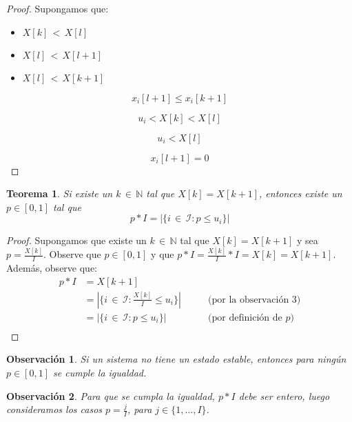\documentclass{article}
\newtheorem{teor}{Teorema}
\newtheorem{obs}{Observación}
\begin{document}
\begin{proof}
Supongamos que:
\begin{itemize}
\item $X[k]\,{<}\,X[l]$
\item $X[l]\,{<}\,X[l{+}1]$
\item $X[l]\,{<}\,X[k{+}1]$
\end{itemize}

\[
x_i[l{+}1]\leq x_i[k{+}1]
\]

\[
u_i<X[k]<X[l]
\]

\[
u_i<X[l]
\]

\[
x_i[l+1]=0
\]


\end{proof}

\begin{teor}
Si existe un $k\,{\in}\,\mathbb{N}$ tal que $X[k]=X[k{+}1]$, entonces existe un $p\in[0,1]$ tal que
\[p*I=|\{i\,{\in}\,\mathcal{I}:p\leq u_i\}|\] 
\end{teor}
\begin{proof}

Supongamos que existe un $k\,{\in}\,\mathbb{N}$ tal que $X[k]=X[k{+}1]$ y sea $p=\frac{X[k]}{I}$. Observe que $p\in[0,1]$ y que $p*I=\frac{X[k]}{I}*I=X[k]=X[k{+}1]$. Además, observe que:
\begin{align*}
p*I&=X[k{+}1]\\
&=|\{i\,{\in}\,\mathcal{I}:\frac{X[k]}{I}\leq u_i\}| &\qquad\mbox{(por la observación 3)}\\
&=|\{i\,{\in}\,\mathcal{I}:p\leq u_i\}| &\qquad\mbox{(por definición de $p$)}\\
\end{align*}
\end{proof}

\begin{obs}
Si un sistema no tiene un estado estable, entonces para ningún $p\in[0,1]$ se cumple la igualdad.
\end{obs}

\begin{obs}
Para que se cumpla la igualdad, $p*I$ debe ser entero, luego consideramos los casos $p=\frac{j}{I}$, para $j\in\{1,\ldots,I\}$.
\end{obs}
\end{document}
